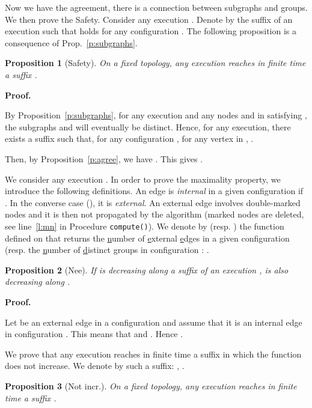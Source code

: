 \documentclass[11pt,english]{article}
\newtheorem{proposition}{Proposition}
\newenvironment{proof}[1][0cm]{
  \begin{list}{\bf Proof.~}{
      \setlength{\itemindent}{0cm}
      \setlength{\labelsep}{0cm}
      \setlength{\labelwidth}{#1}
      \setlength{\leftmargin}{#1}
    \item
    }
}{\hfill
  \end{list}
}
\begin{document}
Now we have the agreement, there is a connection between subgraphs and
groups. We then prove the Safety.
Consider any execution . Denote by  the suffix of an execution  such that 
holds for any configuration . The following proposition is
a consequence of Prop.~\ref{p:subgraphs}.


\begin{proposition}[Safety]\label{p:safe}
On a fixed topology, any execution  reaches in finite time a suffix .
\end{proposition}

\begin{proof}
  By Proposition~\ref{p:subgraphs}, for any execution and any nodes  and 
  in  satisfying , the subgraphs  and  will
  eventually be distinct. Hence, for any execution, there exists a suffix
   such that, for any configuration ,
  for any vertex  in , .

  Then, by Proposition~\ref{p:agree}, we have . This gives .
\end{proof}




We consider any execution .  In order to prove the maximality
property, we introduce the following definitions.  An edge  is
\emph{internal} in a given configuration  if .  In
the converse case (), it is \emph{external}.
An external edge involves double-marked nodes and it is then not propagated by
the algorithm (marked nodes are deleted, see line~\ref{l:mn} in Procedure
\texttt{compute()}).
We denote by  (resp. ) the function defined on  that
returns the \underline{n}umber of \underline{e}xternal \underline{e}dges in a
given configuration (resp. the \underline{n}umber of \underline{d}istinct
\underline{g}roups in configuration : .


\begin{proposition}[Nee]\label{p:nee}
  If  is decreasing along a suffix  of an execution ,  is also
  decreasing along .
\end{proposition}

\begin{proof}
  Let  be an external edge in a configuration  and assume that it is
  an internal edge in configuration . This means that  and . Hence
  .
\end{proof}

We prove that any execution reaches in finite time a suffix in which the
function  does not increase. We denote by  such a
suffix: , .

\begin{proposition}[Not incr.]\label{p:notincr}
  On a fixed topology, any execution  reaches in finite time a suffix
  \emph{}.
\end{proposition}
\end{document}
